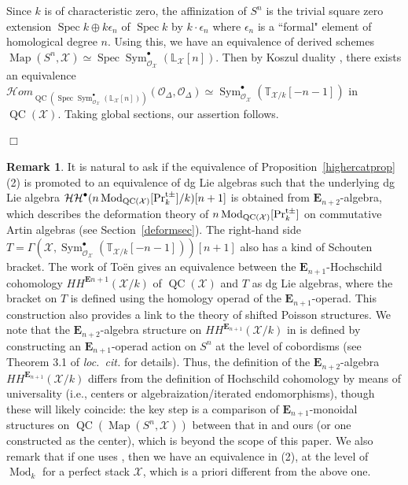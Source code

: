 \documentclass[leqno,12pt]{amsart}
\theoremstyle{plain}
\theoremstyle{definition}
\newtheorem{Remark}[Theorem]{Remark}
\newcommand{\HH}{\operatorname{\mathcal{HH}}}
\newcommand{\PRTTT}{\textup{Pr}^{\textup{t}\pm}}
\newcommand{\OO}{{\mathcal{O}}}
\newcommand{\Spec}{\operatorname{Spec}}
\newcommand{\Mod}{\operatorname{Mod}}
\newcommand{\Map}{\operatorname{Map}}
\newcommand{\QC}{\operatorname{QC}}
\newcommand{\XX}{\mathcal{X}}
\newcommand{\Sym}{\operatorname{Sym}}
\newcommand{\QED}{{\unskip\nobreak\hfil\penalty50\quad\null\nobreak\hfil
{$\Box$}\parfillskip0pt\finalhyphendemerits0\par\medskip}}
\begin{document}
Since $k$ is of characteristic zero, the affinization of $S^n$ is the trivial square zero extension $\Spec k\oplus k\epsilon_n$ of $\Spec k$ by $k\cdot \epsilon_n$
where $\epsilon_n$ is a ``formal" element of homological degree $n$.
Using this, we have an equivalence of derived schemes
$\Map(S^n,\mathcal{X})\simeq \Spec \Sym_{\OO_{\mathcal{X}}}^{\bullet}(\mathbb{L}_{\mathcal{X}}[n])$.
Then by Koszul duality \cite[Proof of Theorem 3.8, Theorem 4.3, Corollary 4.4]{H}, there exists an equivalence
$\mathcal{H}om_{\QC(\Spec\Sym_{\OO_{\mathcal{X}}}^{\bullet}(\mathbb{L}_{\mathcal{X}}[n]))}(\OO_{\Delta}, \OO_{\Delta})\simeq \Sym_{\OO_{\XX}}^{\bullet}(\mathbb{T}_{\XX/k}[-n-1])$
in $\QC(\mathcal{X})$. Taking global sections, our assertion follows.
\QED


\begin{Remark}
\label{cobor}
It is natural to ask if the equivalence of Proposition~\ref{highercatprop} (2) is promoted to an equivalence
of dg Lie algebras such that the underlying dg Lie algebra $\HH^\bullet(n\Mod_{\QC(\mathcal{X})}[\PRTTT_k]/k)[n+1]$ is obtained from
$\mathbf{E}_{n+2}$-algebra, which describes the deformation theory of $n\Mod_{\QC(\mathcal{X})}[\PRTTT_k]$ on commutative Artin algebras (see Section~\ref{deformsec}).
The right-hand side $T=\Gamma(\XX,\Sym_{\OO_{\XX}}^{\bullet}(\mathbb{T}_{\XX/k}[-n-1]))[n+1]$ also has a kind of Schouten bracket.
The work of Toën \cite[Section 5]{Toen} gives an equivalence between the $\mathbf{E}_{n+1}$-Hochschild cohomology $HH^{\mathbf{E}{n+1}}(\mathcal{X}/k)$ of $\QC(\mathcal{X})$ and $T$ as dg Lie algebras, where the bracket on $T$ is defined using the homology operad of the $\mathbf{E}_{n+1}$-operad. 
This construction also provides a link to the theory of shifted Poisson structures.
We note that the $\mathbf{E}_{n+2}$-algebra structure on $HH^{\mathbf{E}_{n+1}}(\mathcal{X}/k)$ in \cite{Toen} is defined by constructing
an $\mathbf{E}_{n+1}$-operad action on $S^n$ at the level of cobordisms (see Theorem 3.1 of {\it loc.\ cit.} for details).
Thus, the definition of the $\mathbf{E}_{n+2}$-algebra $HH^{\mathbf{E}_{n+1}}(\mathcal{X}/k)$ differs from the definition of Hochschild cohomology by means of universality (i.e., centers or algebraization/iterated endomorphisms),
though these will likely coincide:
the key step is a comparison of $\mathbf{E}_{n+1}$-monoidal structures on $\QC(\Map(S^n,\mathcal{X}))$ 
between that in \cite{Toen} and  ours (or one constructed as the center), which is beyond the scope of this paper.
We also remark that if one uses \cite{Toen}, then we have an equivalence in (2), at the level of $\Mod_k$ for a perfect stack $\XX$, which is a priori different from the above one. 
\end{Remark}
\end{document}
